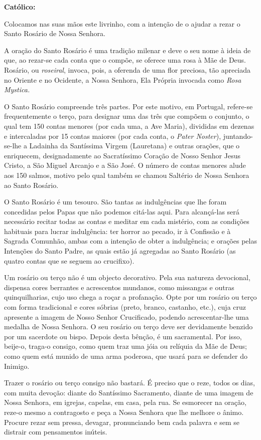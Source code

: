\textbf{Católico:}

Colocamos nas suas mãos este livrinho, com a intenção de o ajudar a rezar o Santo Rosário de Nossa Senhora.

A oração do Santo Rosário é uma tradição milenar e deve o seu nome à ideia de que, ao rezar-se cada conta que o compõe, se oferece uma rosa à Mãe de Deus. Rosário, ou \textit{roseiral}, invoca, pois, a oferenda de uma flor preciosa, tão apreciada no Oriente e no Ocidente, a Nossa Senhora, Ela Própria invocada como \textit{Rosa Mystica.}

O Santo Rosário compreende três partes. Por este motivo, em Portugal, refere-se frequentemente o terço, para designar uma das três que compõem o conjunto, o qual tem 150 contas menores (por cada uma, a Ave Maria), divididas em dezenas e intercaladas por 15 contas maiores (por cada conta, o \textit{Pater Noster}), juntando-se-lhe a Ladainha da Santíssima Virgem (Lauretana) e outras orações, que o enriquecem, designadamente ao Sacratíssimo Coração de Nosso Senhor Jesus Cristo, a São Miguel Arcanjo e a São José. O número de contas menores alude aos 150 salmos, motivo pelo qual também se chamou Saltério de Nossa Senhora ao Santo Rosário.

O Santo Rosário é um tesouro. São tantas as indulgências que lhe foram concedidas pelos Papas que não podemos citá-las aqui. Para alcançá-las será necessário recitar todas as contas e meditar em cada mistério, com as condições habituais para lucrar indulgência: ter horror ao pecado, ir à Confissão e à Sagrada Comunhão, ambas com a intenção de obter a indulgência; e orações pelas Intenções do Santo Padre, as quais estão já agregadas ao Santo Rosário (as quatro contas que se seguem ao crucifixo).

Um rosário ou terço não é um objecto decorativo. Pela sua natureza devocional, dispensa cores berrantes e acrescentos mundanos, como missangas e outras quinquilharias, cujo uso chega a roçar a profanação. Opte por um rosário ou terço com forma tradicional e cores sóbrias (preto, branco, castanho, etc.), cuja cruz apresente a imagem de Nosso Senhor Crucificado, podendo acrescentar-lhe uma medalha de Nossa Senhora. O seu rosário ou terço deve ser devidamente benzido por um sacerdote ou bispo. Depois desta bênção, é um sacramental. Por isso, beije-o, traga-o consigo, como quem traz uma jóia ou relíquia da Mãe de Deus; como quem está munido de uma arma poderosa, que usará para se defender do Inimigo.

Trazer o rosário ou terço consigo não bastará. É preciso que o reze, todos os dias, com muita devoção: diante do Santíssimo Sacramento, diante de uma imagem de Nossa Senhora, em igrejas, capelas, em casa, pela rua. Se esmorecer na oração, reze-o mesmo a contragosto e peça a Nossa Senhora que lhe melhore o ânimo. Procure rezar sem pressa, devagar, pronunciando bem cada palavra e sem se distrair com pensamentos inúteis.

